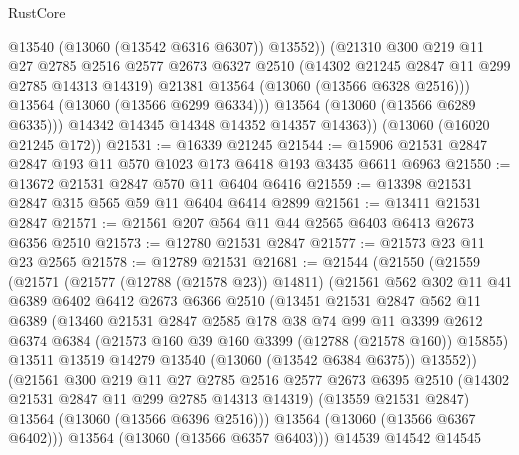 \begin{lexlean}{RustCore}
\begin{coremodule}
                @13540
                (@13060 (@13542 @6316 @6307))
                @13552))
            (@21310
              @300
              @219
              @11
              @27
              @2785
              @2516
              @2577
              @2673
              @6327
              @2510
              (@14302 @21245 @2847 @11 @299 @2785 @14313 @14319)
              @21381
              @13564
              (@13060 (@13566 @6328 @2516)))
            @13564
            (@13060 (@13566 @6299 @6334)))
          @13564
          (@13060 (@13566 @6289 @6335)))
        @14342
        @14345
        @14348
        @14352
        @14357
        @14363))
    (@13060 (@16020 @21245 @172))
@21531 := @16339 @21245
@21544 := @15906 @21531 @2847 @2847 @193 @11 @570 @1023 @173 @6418 @193 @3435 @6611 @6963
@21550 := @13672 @21531 @2847 @570 @11 @6404 @6416
@21559 := @13398 @21531 @2847 @315 @565 @59 @11 @6404 @6414 @2899
@21561 := @13411 @21531 @2847
@21571 := @21561 @207 @564 @11 @44 @2565 @6403 @6413 @2673 @6356 @2510
@21573 := @12780 @21531 @2847
@21577 := @21573 @23 @11 @23 @2565
@21578 := @12789 @21531
@21681 := @21544
    (@21550
      (@21559
        (@21571
          (@21577 (@12788 (@21578 @23)) @14811)
          (@21561
            @562
            @302
            @11
            @41
            @6389
            @6402
            @6412
            @2673
            @6366
            @2510
            (@13451
              @21531
              @2847
              @562
              @11
              @6389
              (@13460
                @21531
                @2847
                @2585
                @178
                @38
                @74
                @99
                @11
                @3399
                @2612
                @6374
                @6384
                (@21573 @160 @39 @160 @3399 (@12788 (@21578 @160)) @15855)
                @13511
                @13519
                @14279
                @13540
                (@13060 (@13542 @6384 @6375))
                @13552))
            (@21561
              @300
              @219
              @11
              @27
              @2785
              @2516
              @2577
              @2673
              @6395
              @2510
              (@14302 @21531 @2847 @11 @299 @2785 @14313 @14319)
              (@13559 @21531 @2847)
              @13564
              (@13060 (@13566 @6396 @2516)))
            @13564
            (@13060 (@13566 @6367 @6402)))
          @13564
          (@13060 (@13566 @6357 @6403)))
        @14539
        @14542
        @14545

\end{coremodule}
\end{lexlean}
